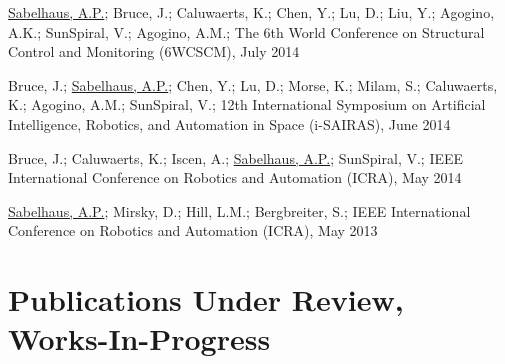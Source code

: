 \documentclass[letterpaper]{deedy-resume} %
\begin{document}
\begin{etaremune}
\item {} \underline{Sabelhaus, A.P.}; Bruce, J.; Caluwaerts, K.; Chen, Y.; Lu, D.; Liu, Y.; Agogino, A.K.; SunSpiral, V.; Agogino, A.M.; The 6th World Conference on Structural Control and Monitoring (6WCSCM), July 2014

\item {} Bruce, J.; \underline{Sabelhaus, A.P.}; Chen, Y.; Lu, D.; Morse, K.; Milam, S.; Caluwaerts, K.; Agogino, A.M.; SunSpiral, V.; 12th International Symposium on Artificial Intelligence, Robotics, and Automation in Space (i-SAIRAS), June 2014

\item {} Bruce, J.; Caluwaerts, K.; Iscen, A.; \underline{Sabelhaus, A.P.}; SunSpiral, V.; IEEE International Conference on Robotics and Automation (ICRA), May 2014

\item {} \underline{Sabelhaus, A.P.}; Mirsky, D.; Hill, L.M.; Bergbreiter, S.; IEEE International Conference on Robotics and Automation (ICRA), May 2013


\end{etaremune}




  
\section{Publications Under Review, Works-In-Progress}

\vspace{0.2cm}
\end{document}

